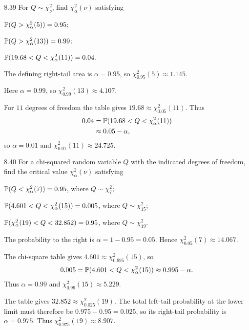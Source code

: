 \documentclass[11pt,oneside]{article}
\begin{document}
\begin{exercise}{8.39}
For $Q\sim\chi^2_\nu$, find $\chi^2_\alpha(\nu)$ satisfying
\begin{exercisesubparts}
\item $\mathbb{P}(Q>\chi^2_\alpha(5))=0.95$;
\item $\mathbb{P}(Q>\chi^2_\alpha(13))=0.99$;
\item $\mathbb{P}(19.68<Q<\chi^2_\alpha(11))=0.04$.
\end{exercisesubparts}
\end{exercise}
\begin{solution}
\begin{exercisesubparts}
\item The defining right-tail area is $\alpha=0.95$, so $\boxed{\chi^2_{0.95}(5)\approx1.145}$.
\item Here $\alpha=0.99$, so $\boxed{\chi^2_{0.99}(13)\approx4.107}$.
\item For $11$ degrees of freedom the table gives $19.68\approx\chi^2_{0.05}(11)$. Thus
\[
\begin{aligned}
0.04&=\mathbb{P}(19.68<Q<\chi^2_\alpha(11))\\
&\approx0.05-\alpha,
\end{aligned}
\]
so $\alpha=0.01$ and $\boxed{\chi^2_{0.01}(11)\approx24.725}$.
\end{exercisesubparts}
\end{solution}

\begin{exercise}{8.40}
For a chi-squared random variable $Q$ with the indicated degrees of freedom, find the critical value $\chi^2_\alpha(\nu)$ satisfying
\begin{exercisesubparts}
\item $\mathbb{P}(Q<\chi^2_\alpha(7))=0.95$, where $Q\sim\chi^2_7$;
\item $\mathbb{P}(4.601<Q<\chi^2_\alpha(15))=0.005$, where $Q\sim\chi^2_{15}$;
\item $\mathbb{P}(\chi^2_\alpha(19)<Q<32.852)=0.95$, where $Q\sim\chi^2_{19}$.
\end{exercisesubparts}
\end{exercise}
\begin{solution}
\begin{exercisesubparts}
\item The probability to the right is $\alpha=1-0.95=0.05$. Hence $\boxed{\chi^2_{0.05}(7)\approx14.067}$.
\item The chi-square table gives $4.601\approx\chi^2_{0.995}(15)$, so
\[
0.005=\mathbb{P}(4.601<Q<\chi^2_\alpha(15))\approx0.995-\alpha.
\]
Thus $\alpha=0.99$ and $\boxed{\chi^2_{0.99}(15)\approx5.229}$.
\item The table gives $32.852\approx\chi^2_{0.025}(19)$. The total left-tail probability at the lower limit must therefore be $0.975-0.95=0.025$, so its right-tail probability is $\alpha=0.975$. Thus $\boxed{\chi^2_{0.975}(19)\approx8.907}$.
\end{exercisesubparts}
\end{solution}
\end{document}

